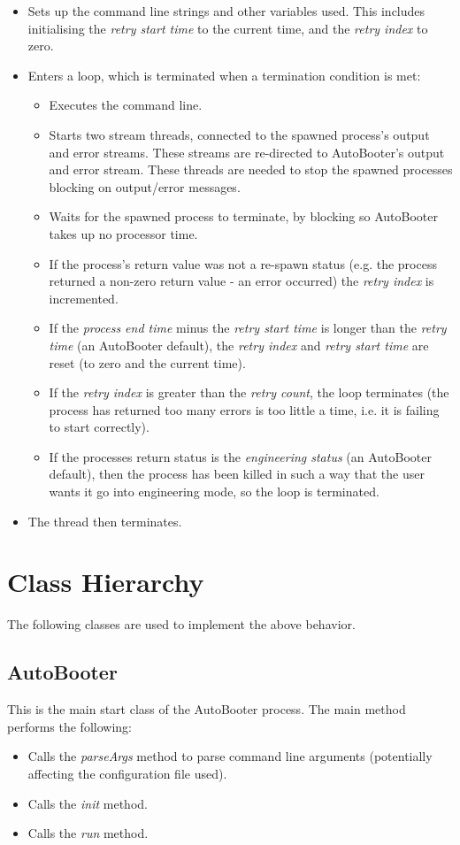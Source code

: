 \documentclass[10pt,a4paper]{article}
\begin{document}
\begin{itemize}
\item Sets up the command line strings and other variables used. This includes initialising the {\em retry start time}
	to the current time, and the {\em retry index} to zero.
\item Enters a loop, which is terminated when a termination condition is met:
     \begin{itemize}
     \item Executes the command line.
     \item Starts two stream threads, connected to the spawned process's output and error streams. These streams
	are re-directed to AutoBooter's output and error stream. These threads are needed to stop the
	spawned processes blocking on output/error messages.
     \item Waits for the spawned process to terminate, by blocking so AutoBooter takes up no processor time.
     \item If the process's return value was not a re-spawn status (e.g. the process returned a non-zero 
	return value - an error occurred) the {\em retry index} is incremented.
     \item If the {\em process end time} minus the {\em retry start time} is longer than the {\em retry time} 
	(an AutoBooter default), the {\em retry index} and {\em retry start time} are reset 
	(to zero and the current time).
     \item If the {\em retry index} is greater than the {\em retry count}, the loop terminates 
	(the process has returned too many errors is too little a time, i.e. it is failing to start correctly).
     \item If the processes return status is the {\em engineering status} (an AutoBooter default), then the 
	process has been killed in such a way that the user wants it go into engineering mode, so the loop
	is terminated.
     \end{itemize}
\item The thread then terminates.
\end{itemize}

\section{Class Hierarchy}
The following classes are used to implement the above behavior.

\subsection{AutoBooter}
This is the main start class of the AutoBooter process. The main method performs the following:
\begin{itemize}
\item Calls the {\em parseArgs} method to parse command line arguments (potentially affecting the
	configuration file used).
\item Calls the {\em init} method.
\item Calls the {\em run} method.
\end{itemize}
\end{document}

